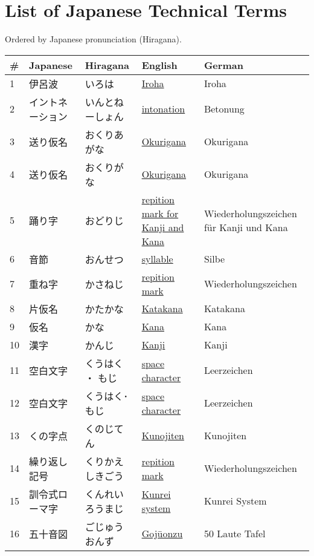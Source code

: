 \chapter{List of Japanese Technical Terms}
\label{chap:ListOfJapaneseTechnicalTerms}
\label{sec:JapaneseTechnicalTerms}
\normalsize Ordered by Japanese pronunciation (Hiragana).
\footnotesize\Padding
\begin{longtable}[c]{p{.5cm}p{3.5cm}p{4cm}p{3.5cm}p{3.5cm}}
\textbf{\#}&\textbf{Japanese}&\textbf{Hiragana}&\textbf{English}&\textbf{German}\\ \hline
1&伊呂波&いろは&\hyperref[sec:Iroha]{Iroha}&Iroha\\
2&イントネーション&いんとねーしょん&\hyperref[sec:Intonation]{intonation}&Betonung\\
3&送り仮名&おくりあがな&\hyperref[sec:Okurigana]{Okurigana}&Okurigana\\
4&送り仮名&おくりがな&\hyperref[sec:Okurigana]{Okurigana}&Okurigana\\
5&踊り字&おどりじ&\hyperref[sec:RepitionMarkForKanjiAndKana]{repition mark for Kanji and Kana}&Wiederholungszeichen für Kanji und Kana\\
6&音節&おんせつ&\hyperref[sec:Syllable]{syllable}&Silbe\\
7&重ね字&かさねじ&\hyperref[sec:RepitionMark]{repition mark}&Wiederholungszeichen\\
8&片仮名&かたかな&\hyperref[sec:Katakana]{Katakana}&Katakana\\
9&仮名&かな&\hyperref[sec:Kana]{Kana}&Kana\\
10&漢字&かんじ&\hyperref[sec:Kanji]{Kanji}&Kanji\\
11&空白文字&くうはく ・ もじ&\hyperref[sec:SpaceCharacter]{space character}&Leerzeichen\\
12&空白文字&くうはく･もじ&\hyperref[sec:SpaceCharacter]{space character}&Leerzeichen\\
13&くの字点&くのじてん&\hyperref[sec:Kunojiten]{Kunojiten}&Kunojiten\\
14&繰り返し記号&くりかえしきごう&\hyperref[sec:RepitionMark]{repition mark}&Wiederholungszeichen\\
15&訓令式ローマ字&くんれいろうまじ&\hyperref[sec:KunreiSystem]{Kunrei system}&Kunrei System\\
16&五十音図&ごじゅうおんず&\hyperref[sec:Gojuonzu]{Gojūonzu}&50 Laute Tafel\\

\end{longtable}
